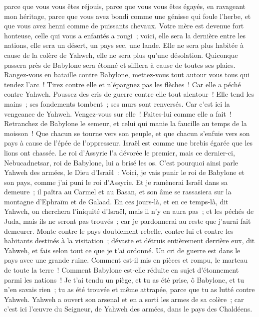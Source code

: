 \begin{multicols}{2}
parce que vous vous êtes réjouis, parce que vous vous êtes égayés, en ravageant mon héritage, parce que vous avez bondi comme une génisse qui foule l'herbe, et que vous avez henni comme de puissants chevaux.
Votre mère est devenue fort honteuse, celle qui vous a enfantés a rougi~; voici, elle sera la dernière entre les nations, elle sera un désert, un pays sec, une lande.
Elle ne sera plus habitée à cause de la colère de Yahweh, elle ne sera plus qu'une désolation. Quiconque passera près de Babylone sera étonné et sifflera à cause de toutes ses plaies.
Rangez-vous en bataille contre Babylone, mettez-vous tout autour vous tous qui tendez l'arc~! Tirez contre elle et n'épargnez pas les flèches~! Car elle a péché contre Yahweh.
Poussez des cris de guerre contre elle tout alentour~! Elle tend les mains~; ses fondements tombent~; ses murs sont renversés. Car c'est ici la vengeance de Yahweh. Vengez-vous sur elle~! Faites-lui comme elle a fait~!
Retranchez de Babylone le semeur, et celui qui manie la faucille au temps de la moisson~! Que chacun se tourne vers son peuple, et que chacun s'enfuie vers son pays à cause de l'épée de l'oppresseur.
Israël est comme une brebis égarée que les lions ont chassée. Le roi d'Assyrie l'a dévorée le premier, mais ce dernier-ci, Nebucadnetsar, roi de Babylone, lui a brisé les os.
C'est pourquoi ainsi parle Yahweh des armées, le Dieu d'Israël~: Voici, je vais punir le roi de Babylone et son pays, comme j'ai puni le roi d'Assyrie.
Et je ramènerai Israël dans sa demeure~; il paîtra au Carmel et au Basan, et son âme se rassasiera sur la montagne d'Ephraïm et de Galaad.
En ces jours-là, et en ce temps-là, dit Yahweh, on cherchera l'iniquité d'Israël, mais il n'y en aura pas~; et les péchés de Juda, mais ils ne seront pas trouvés~; car je pardonnerai au reste que j'aurai fait demeurer.
Monte contre le pays doublement rebelle, contre lui et contre les habitants destinés à la visitation~; dévaste et détruis entièrement derrière eux, dit Yahweh, et fais selon tout ce que je t'ai ordonné.
Un cri de guerre est dans le pays avec une grande ruine.
Comment est-il mis en pièces et rompu, le marteau de toute la terre~! Comment Babylone est-elle réduite en sujet d'étonnement parmi les nations~!
Je t'ai tendu un piège, et tu as été prise, ô Babylone, et tu n'en savais rien~; tu as été trouvée et même attrapée, parce que tu as lutté contre Yahweh.
Yahweh a ouvert son arsenal et en a sorti les armes de sa colère~; car c'est ici l'œuvre du Seigneur, de Yahweh des armées, dans le pays des Chaldéens.

\end{multicols}
